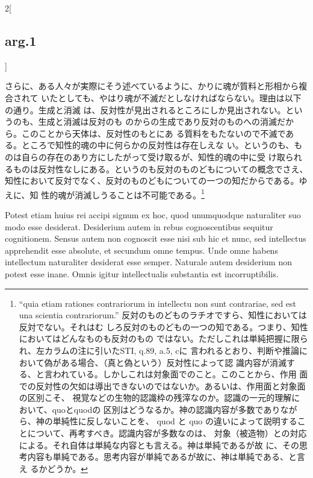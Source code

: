 \documentclass[paper=a4paper,fontsize=10pt,jafontsize=9pt,titlepage]{jlreq}
\begin{document}
\begin{paracol}{2}[\subsection{arg.1}]
\switchcolumn

さらに、ある人々が実際にそう述べているように、かりに魂が質料と形相から複合されて
いたとしても、やはり魂が不滅だとしなければならない。理由は以下の通り。生成と消滅
は、反対性が見出されるところにしか見出されない。というのも、生成と消滅は反対のも
のからの生成であり反対のものへの消滅だから。このことから天体は、反対性のもとにあ
る質料をもたないので不滅である。ところで知性的魂の中に何らかの反対性は存在しえな
い。というのも、ものは自らの存在のあり方にしたがって受け取るが、知性的魂の中に受
け取られるものは反対性なしにある。というのも反対のものどもについての概念でさえ、
知性において反対でなく、反対のものどもについての一つの知だからである。ゆえに、知
性的魂が消滅しうることは不可能である。\footnote{ ``quia etiam rationes
contrariorum in intellectu non sunt contrariae, sed est una scientia
contrariorum.'' 反対のものどものラチオですら、知性においては反対でない。それはむ
しろ反対のものどもの一つの知である。つまり、知性においてはどんなものも反対のもの
ではない。ただしこれは単純把握に限られ、左カラムの注に引いたSTI, q.89, a.5, cに
言われるとおり、判断や推論において偽がある場合、（真と偽という）反対性によって認
識内容が消滅する、と言われている。しかしこれは対象面でのこと。このことから、作用
面での反対性の欠如は導出できないのではないか。あるいは、作用面と対象面の区別こそ、
視覚などの生物的認識枠の残滓なのか。認識の一元的理解において、quoとquodの
区別はどうなるか。神の認識内容が多数でありながら、神の単純性に反しないことを、
quod と quo の違いによって説明することについて、再考すべき。認識内容が多数なのは、
対象（被造物）との対応による。それ自体は単純な内容とも言える。神は単純であるが故
に、その思考内容も単純である。思考内容が単純であるが故に、神は単純である、と言え
るかどうか。}

 
 
 
\switchcolumn*

Potest etiam huius rei accipi signum ex hoc, quod unumquodque naturaliter suo
modo esse desiderat. Desiderium autem in rebus cognoscentibus sequitur
cognitionem. Sensus autem non cognoscit esse nisi sub hic et nunc, sed
intellectus apprehendit esse absolute, et secundum omne tempus. Unde omne habens
intellectum naturaliter desiderat esse semper. Naturale autem desiderium non
potest esse inane. Omnis igitur intellectualis substantia est incorruptibilis.



\end{paracol}
\end{document}
